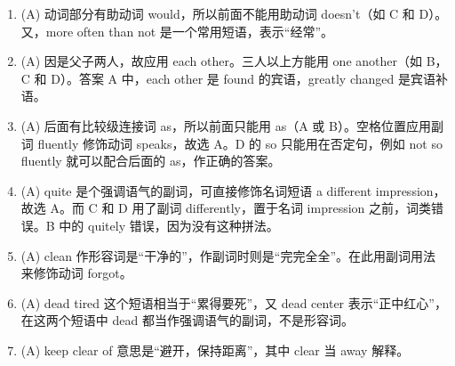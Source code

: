 \begin{enumerate}
\item (A) 动词部分有助动词 would，所以前面不能用助动词 doesn't（如 C 和 D）。又，more often than not 是一个常用短语，表示“经常”。
\item (A) 因是父子两人，故应用 each other。三人以上方能用 one another（如 B，C
  和 D）。答案 A 中，each other 是 found 的宾语，greatly changed 是宾语补语。
\item (A) 后面有比较级连接词 as，所以前面只能用 as（A 或 B）。空格位置应用副词 fluently 修饰动词 speaks，故选 A。D 的 so 只能用在否定句，例如 not so fluently 就可以配合后面的 as，作正确的答案。
\item (A) quite 是个强调语气的副词，可直接修饰名词短语 a different impression，故选 A。而 C 和 D 用了副词 differently，置于名词 impression 之前，词类错误。B 中的 quitely 错误，因为没有这种拼法。
\item (A) clean 作形容词是“干净的”，作副词时则是“完完全全”。在此用副词用法来修饰动词 forgot。
\item (A) dead tired 这个短语相当于“累得要死”，又 dead center 表示“正中红心”，在这两个短语中 dead 都当作强调语气的副词，不是形容词。
\item (A) keep clear of 意思是“避开，保持距离”，其中 clear 当 away 解释。


\end{enumerate}
